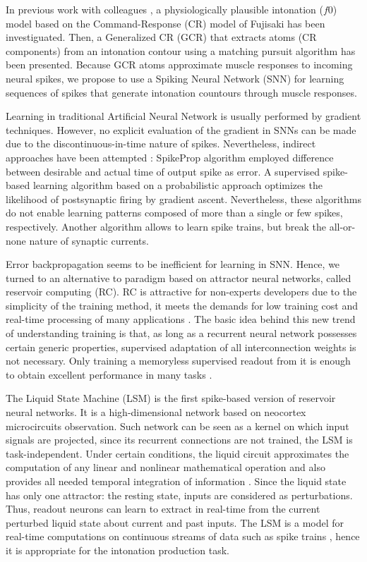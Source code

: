 \documentclass[11pt, a4paper]{article} %
\begin{document}
In previous work with colleagues \cite{honnet2015atom}, a physiologically plausible intonation ($f0$) model based on the Command-Response (CR) model of Fujisaki \cite{fujisaki1998command} has been investiguated. Then, a Generalized CR (GCR) \cite{schnell2018neural} that extracts atoms (CR components) from an intonation contour using a matching pursuit algorithm \cite{mallat1993matching} has been presented. Because GCR atoms approximate muscle responses to incoming neural spikes, we propose to use a Spiking Neural Network (SNN) for learning sequences of spikes that generate intonation countours through muscle responses.

Learning in traditional Artificial Neural Network is usually performed by gradient techniques. However, no explicit evaluation of the gradient in SNNs can be made due to the discontinuous-in-time nature of spikes. Nevertheless, indirect approaches have been attempted :
SpikeProp algorithm \cite{bohte2002error} employed difference between desirable and actual time of output spike as error. A supervised spike-based learning algorithm based on a probabilistic approach \cite{pfister2006optimal} optimizes the likelihood of postsynaptic firing by gradient ascent. Nevertheless, these algorithms do not enable learning patterns composed of more than a single or few spikes, respectively.
Another algorithm \cite{huh2018gradient} allows to learn spike trains, but break the all-or-none nature of synaptic currents.

Error backpropagation seems to be inefficient for learning in SNN. Hence, we turned to an alternative to paradigm based on attractor neural networks, called reservoir computing (RC). RC is attractive for non-experts developers due to the simplicity of the training method, it meets the demands for low training cost and real-time processing of many applications \cite{tanaka2019recent}. The basic idea behind this new trend of understanding training is that, as long as a recurrent neural network possesses certain generic properties, supervised adaptation of all interconnection weights is not necessary. Only training a memoryless supervised readout from it is enough to obtain excellent performance in many tasks \cite{lukovsevivcius2012reservoir}. 

The Liquid State Machine (LSM) \cite{maass2002real} is the first spike-based version of reservoir neural networks. It is a high-dimensional network based on neocortex microcircuits observation. Such network can be seen as a kernel on which input signals are projected, since its recurrent connections are not trained, the LSM is task-independent. 
Under certain conditions, the liquid circuit approximates the computation of any linear and nonlinear mathematical operation and also provides all needed temporal integration of information \cite{maass2011liquid}. Since the liquid state has only one attractor: the resting state, inputs are considered as perturbations. Thus, readout neurons can learn to extract in real-time from the current perturbed liquid state about current and past inputs. The LSM is a model for real-time computations on continuous streams of data such as spike trains \cite{maass2011liquid}, hence it is appropriate for the intonation production task.
\end{document}
